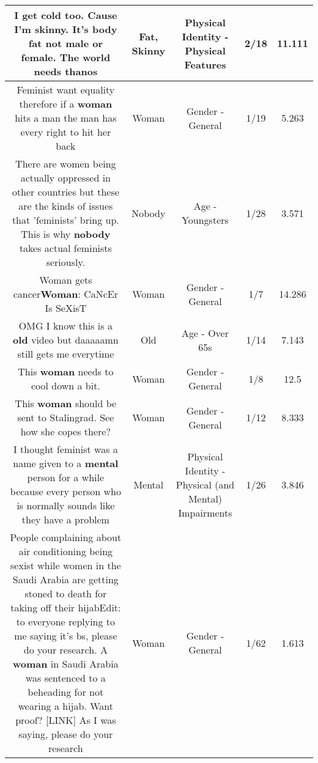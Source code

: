 \documentclass[11pt]{article}
\newlength\mylength
\begin{document}
\begin{center}
\begin{longtable}{|C{.65\mylength}|C{.30\mylength}|C{.12\mylength}|C{.12\mylength}|C{.12\mylength}|}
  \small I get cold too. Cause I'm \textbf{skinny}. It's body \textbf{fat} not male or female. The world needs thanos\normalsize   & Fat, Skinny & Physical Identity - Physical Features & 2/18 & 11.111 \\  \hline
  \small Feminist want equality therefore if a \textbf{woman} hits a man the man has every right to hit her back\normalsize   & Woman & Gender - General & 1/19 & 5.263 \\  \hline
  \small There are women being actually oppressed in other countries but these are the kinds of issues that 'feminists' bring up. This is why \textbf{nobody} takes actual feminists seriously.\normalsize   & Nobody & Age - Youngsters & 1/28 & 3.571 \\  \hline
  \small Woman gets cancer\textbf{Woman}: CaNcEr Is SeXisT\normalsize   & Woman & Gender - General & 1/7 & 14.286 \\  \hline
  \small OMG I know this is a \textbf{old} video but daaaaamn still gets me everytime\normalsize   & Old & Age - Over 65s & 1/14 & 7.143 \\  \hline
  \small This \textbf{woman} needs to cool down a bit.\normalsize   & Woman & Gender - General & 1/8 & 12.5 \\  \hline
  \small This \textbf{woman} should be sent to Stalingrad. See how she copes there?\normalsize   & Woman & Gender - General & 1/12 & 8.333 \\  \hline
  \small I thought feminist was a name given to a \textbf{mental} person for a while because every person who is normally sounds like they have a problem\normalsize   & Mental & Physical Identity - Physical (and Mental) Impairments & 1/26 & 3.846 \\  \hline
  \small People complaining about air conditioning  being sexist while women in the Saudi Arabia  are getting stoned to death for taking off their hijabEdit: to everyone replying to me saying it's bs, please do your research. A \textbf{woman} in Saudi  Arabia was sentenced to a beheading for not wearing a hijab. Want proof?  [LINK]  As I was saying, please do your research\normalsize   & Woman & Gender - General & 1/62 & 1.613 \\  \hline

\end{longtable}
\end{center}
\end{document}
